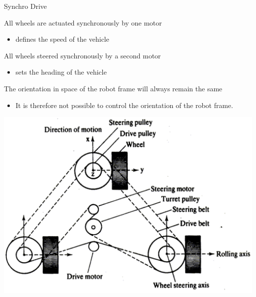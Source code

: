 \documentclass[compress]{beamer}
\begin{document}
\begin{frame}{Synchro Drive}

All wheels are actuated synchronously by one motor

\begin{itemize}
    \item defines the speed of the vehicle
\end{itemize}

All wheels steered synchronously by a second motor

\begin{itemize}
    \item sets the heading of the vehicle
\end{itemize}

The orientation in space of the robot frame will always remain the same

\begin{itemize}
    \item It is therefore not possible to control the orientation of the robot
  frame.
\end{itemize}

    \begin{center}
        \includegraphics[width=0.8\linewidth]{synchrodrive}
    \end{center}

\end{frame}
\end{document}
